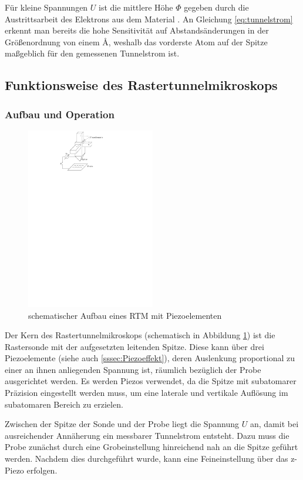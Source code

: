 \documentclass[10pt, a4paper]{article}
\begin{document}
Für kleine Spannungen $U$ ist die mittlere Höhe $\Phi$ gegeben durch die Austrittsarbeit des Elektrons aus dem Material \cite{colton}.
An Gleichung \ref{eq:tunnelstrom} erkennt man bereits die hohe Sensitivität auf Abstandsänderungen in der Größenordnung von einem \si{\angstrom}, weshalb das vorderste Atom auf der Spitze maßgeblich für den gemessenen Tunnelstrom ist.

\subsection{Funktionsweise des Rastertunnelmikroskops}
\subsubsection{Aufbau und Operation}
\begin{figure}[h]
\centering
\includegraphics[width=0.5\textwidth]{./grafiken/rtm_aufbau.pdf}
\caption{schematischer Aufbau eines RTM mit Piezoelementen}
\label{fig:aufbau}
\end{figure}
Der Kern des Rastertunnelmikroskops (schematisch in Abbildung \ref{fig:aufbau}) ist die Rastersonde mit der aufgesetzten leitenden Spitze.
Diese kann über drei Piezoelemente (siehe auch \ref{sssec:Piezoeffekt}), deren Auslenkung proportional zu einer an ihnen anliegenden Spannung ist, räumlich bezüglich der Probe ausgerichtet werden.
Es werden Piezos verwendet, da die Spitze mit subatomarer Präzision eingestellt werden muss, um eine laterale und vertikale Auflösung im subatomaren Bereich zu erzielen.

Zwischen der Spitze der Sonde und der Probe liegt die Spannung $U$ an, damit bei ausreichender Annäherung ein messbarer Tunnelstrom entsteht.
Dazu muss die Probe zunächst durch eine Grobeinstellung hinreichend nah an die Spitze geführt werden.
Nachdem dies durchgeführt wurde, kann eine Feineinstellung über das z-Piezo erfolgen.
\end{document}
